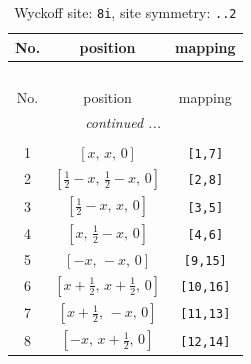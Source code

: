 \documentclass[fleqn,8pt]{jsarticle}
\begin{document}
\renewcommand{\arraystretch}{1.2}
\begin{longtable}{ccc}
\caption{Wyckoff site: {\tt 8i}, site symmetry: {\tt ..2}}
 \\
 \hline \hline
No. & position & mapping \\ \hline \endfirsthead

\multicolumn{2}{l}{\tablename\ \thetable{}} \\
 \hline \hline
No. & position & mapping \\ \hline \endhead

 \hline \hline
\multicolumn{2}{r}{\footnotesize\it continued ...} \\ \endfoot

 \hline \hline
\multicolumn{2}{r}{} \\ \endlastfoot

1 & $\left[ x,\, x,\, 0 \right]$ & {\tt [1,7]} \\ \hline
2 & $\left[ \frac{1}{2} - x,\, \frac{1}{2} - x,\, 0 \right]$ & {\tt [2,8]} \\ \hline
3 & $\left[ \frac{1}{2} - x,\, x,\, 0 \right]$ & {\tt [3,5]} \\ \hline
4 & $\left[ x,\, \frac{1}{2} - x,\, 0 \right]$ & {\tt [4,6]} \\ \hline
5 & $\left[ - x,\, - x,\, 0 \right]$ & {\tt [9,15]} \\ \hline
6 & $\left[ x + \frac{1}{2},\, x + \frac{1}{2},\, 0 \right]$ & {\tt [10,16]} \\ \hline
7 & $\left[ x + \frac{1}{2},\, - x,\, 0 \right]$ & {\tt [11,13]} \\ \hline
8 & $\left[ - x,\, x + \frac{1}{2},\, 0 \right]$ & {\tt [12,14]} \\
\end{longtable}
\renewcommand{\arraystretch}{1.2}
\end{document}
